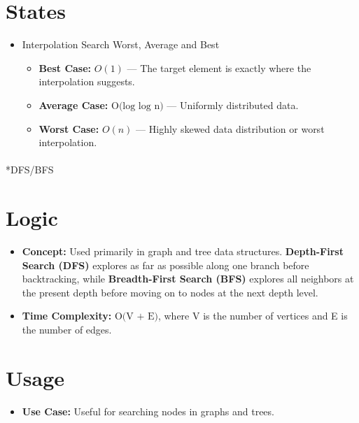 \documentclass[
  letterpaper,
  DIV=11,
  numbers=noendperiod]{scrreprt}
\makeatletter
\let\oldparagraph\paragraph
\renewcommand{\paragraph}{
    \@ifstar
      \xxxParagraphStar
      \xxxParagraphNoStar
  }
\newcommand{\xxxParagraphStar}[1]{\oldparagraph*{#1}\mbox{}}
\newcommand{\xxxParagraphNoStar}[1]{\oldparagraph{#1}\mbox{}}
\providecommand{\tightlist}{%
  \setlength{\itemsep}{0pt}\setlength{\parskip}{0pt}}
\makeatother
\begin{document}
\section{States}

\begin{itemize}
\tightlist
\item
  Interpolation Search Worst, Average and Best

  \begin{itemize}
  \tightlist
  \item
    \textbf{Best Case:} \(O(1)\) --- The target element is exactly where
    the interpolation suggests.
  \item
    \textbf{Average Case:} \(\text{O(log ⁡log⁡ n)}\) --- Uniformly
    distributed data.
  \item
    \textbf{Worst Case:} \(O(n)\) --- Highly skewed data distribution or
    worst interpolation.
  \end{itemize}
\end{itemize}

\paragraph*{DFS/BFS}\label{dfsbfs}

\section{Logic}

\begin{itemize}
\tightlist
\item
  \textbf{Concept:} Used primarily in graph and tree data structures.
  \textbf{Depth-First Search (DFS)} explores as far as possible along
  one branch before backtracking, while \textbf{Breadth-First Search
  (BFS)} explores all neighbors at the present depth before moving on to
  nodes at the next depth level.
\item
  \textbf{Time Complexity:} \(\text{O(V + E)}\), where V is the number
  of vertices and E is the number of edges.
\end{itemize}

\section{Usage}

\begin{itemize}
\tightlist
\item
  \textbf{Use Case:} Useful for searching nodes in graphs and trees.
\end{itemize}
\end{document}
